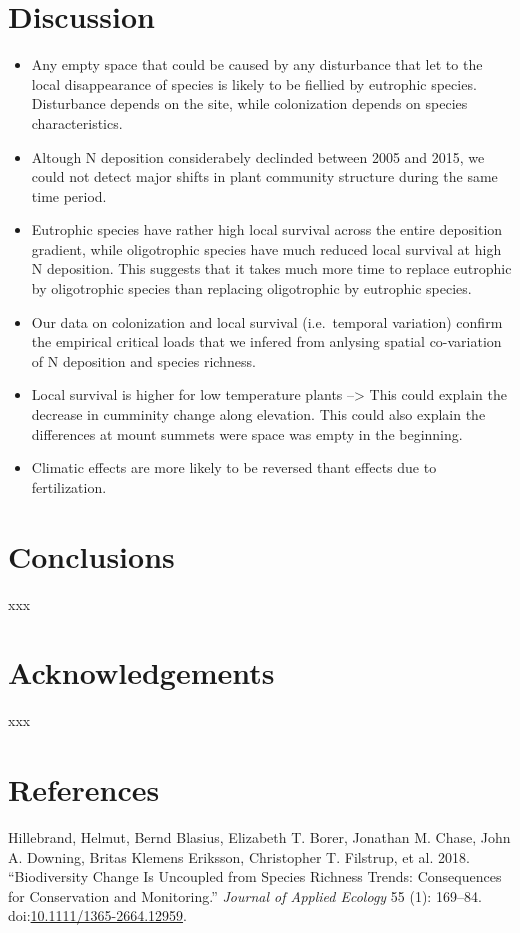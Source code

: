 \documentclass[fleqn,10pt,lineno]{wlpeerj} %
\begin{document}
\section*{Discussion}\label{discussion}

\begin{itemize}
\item
  Any empty space that could be caused by any disturbance that let to
  the local disappearance of species is likely to be fiellied by
  eutrophic species. Disturbance depends on the site, while colonization
  depends on species characteristics.
\item
  Altough N deposition considerabely declinded between 2005 and 2015, we
  could not detect major shifts in plant community structure during the
  same time period.
\item
  Eutrophic species have rather high local survival across the entire
  deposition gradient, while oligotrophic species have much reduced
  local survival at high N deposition. This suggests that it takes much
  more time to replace eutrophic by oligotrophic species than replacing
  oligotrophic by eutrophic species.
\item
  Our data on colonization and local survival (i.e.~temporal variation)
  confirm the empirical critical loads that we infered from anlysing
  spatial co-variation of N deposition and species richness.
\item
  Local survival is higher for low temperature plants --\textgreater{}
  This could explain the decrease in cumminity change along elevation.
  This could also explain the differences at mount summets were space
  was empty in the beginning.
\item
  Climatic effects are more likely to be reversed thant effects due to
  fertilization.
\end{itemize}

\section*{Conclusions}\label{conclusions}

xxx

\section*{Acknowledgements}\label{acknowledgements}

xxx

\section*{References}\label{references}

\hypertarget{refs}{}
\hypertarget{ref-Hillebrand2018}{}
Hillebrand, Helmut, Bernd Blasius, Elizabeth T. Borer, Jonathan M.
Chase, John A. Downing, Britas Klemens Eriksson, Christopher T.
Filstrup, et al. 2018. ``Biodiversity Change Is Uncoupled from Species
Richness Trends: Consequences for Conservation and Monitoring.''
\emph{Journal of Applied Ecology} 55 (1): 169--84.
doi:\href{https://doi.org/10.1111/1365-2664.12959}{10.1111/1365-2664.12959}.
\end{document}
